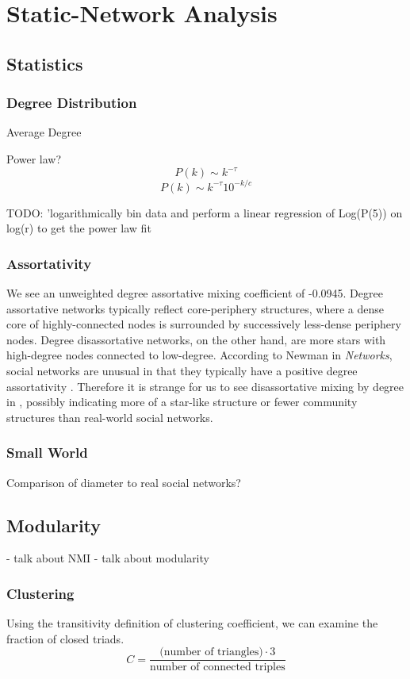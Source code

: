 \section{Static-Network Analysis}

\subsection{Statistics}

\subsubsection{Degree Distribution}
Average Degree

Power law? 
$$P(k) \sim k^{-\tau}$$
$$P(k) \sim k^{-\tau}10^{-k/c}$$

TODO: 'logarithmically bin data and perform a linear regression of Log(P(5)) on log(r) to get the power law fit

\subsubsection{Assortativity}
We see an unweighted degree assortative mixing coefficient of -0.0945.
Degree assortative networks typically reflect core-periphery structures, where a dense core of highly-connected nodes is surrounded by successively less-dense periphery nodes. Degree disassortative networks, on the other hand, are more stars with high-degree nodes connected to low-degree. 
According to Newman in {\em Networks}, social networks are unusual in that they typically have a positive degree assortativity \cite{NewmanBook}. 
Therefore it is strange for us to see disassortative mixing by degree in \infinitejest, possibly indicating more of a star-like structure or fewer community structures than real-world social networks.

\subsubsection{Small World}
Comparison of diameter to real social networks?

\subsection{Modularity}

- talk about NMI
- talk about modularity

\subsubsection{Clustering}
Using the transitivity definition of clustering coefficient, we can examine the fraction of closed triads.
$$ C = \frac{\text{(number of triangles)} \cdot 3}{\text{number of connected triples}} $$

